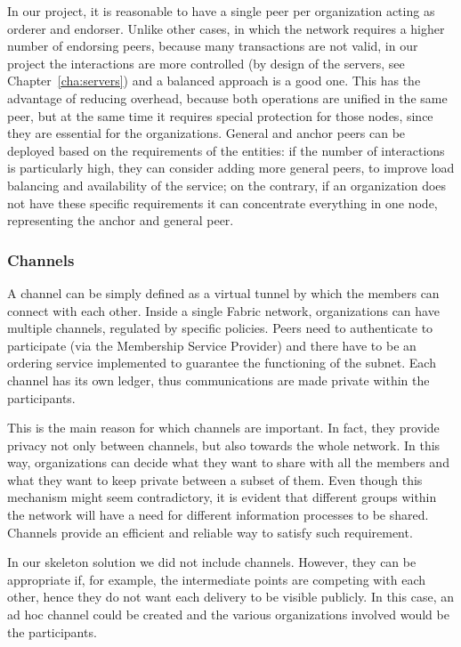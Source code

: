 In our project, it is reasonable to have a single peer per organization acting as orderer and endorser. Unlike other cases, in which the network requires a higher number of endorsing peers, because many transactions are not valid, in our project the interactions are more controlled (by design of the servers, see Chapter~\ref{cha:servers}) and a balanced approach is a good one. This has the advantage of reducing overhead, because both operations are unified in the same peer, but at the same time it requires special protection for those nodes, since they are essential for the organizations. General and anchor peers can be deployed based on the requirements of the entities: if the number of interactions is particularly high, they can consider adding more general peers, to improve load balancing and availability of the service; on the contrary, if an organization does not have these specific requirements it can concentrate everything in one node, representing the anchor and general peer.

\subsubsection{Channels}
A channel can be simply defined as a virtual tunnel by which the members can connect with each other. Inside a single Fabric network, organizations can have multiple channels, regulated by specific policies. Peers need to authenticate to participate (via the Membership Service Provider) and there have to be an ordering service implemented to guarantee the functioning of the subnet. Each channel has its own ledger, thus communications are made private within the participants.

This is the main reason for which channels are important. In fact, they provide privacy not only between channels, but also towards the whole network. In this way, organizations can decide what they want to share with all the members and what they want to keep private between a subset of them.
Even though this mechanism might seem contradictory, it is evident that different groups within the network will have a need for different information processes to be shared. Channels provide an efficient and reliable way to satisfy such requirement.

In our skeleton solution we did not include channels. However, they can be appropriate if, for example, the intermediate points are competing with each other, hence they do not want each delivery to be visible publicly. In this case, an ad hoc channel could be created and the various organizations involved would be the participants.

